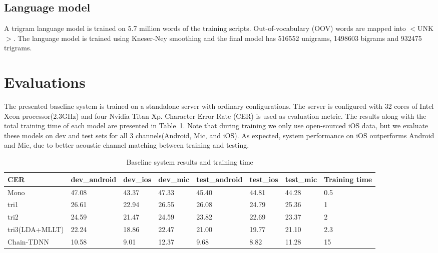 \documentclass[a4paper]{article}
\begin{document}
\subsection{Language model}

A trigram language model is trained on 5.7 million words of the training
scripts. Out-of-vocabulary (OOV) words are mapped into $<$UNK$>$. The language
model is trained using Kneser-Ney smoothing and the final model has 516552
unigrams, 1498603 bigrams and 932475 trigrams.

\section{Evaluations}

The presented baseline system is trained on a standalone server with ordinary
configurations. The server is configured with 32 cores of Intel Xeon processor(2.3GHz) and four
Nvidia Titan Xp. Character Error Rate (CER) is used as evaluation metric. 
The results along with the total training time of each model are presented in Table~\ref{tab:base}. 
Note that during training we only use open-sourced iOS data, but we evaluate
these models on dev and test sets for all 3 channels(Android, Mic, and iOS). As
expected, system performance on iOS outperforms Android and Mic, due to better
acoustic channel matching between training and testing.

\begin{table}[th]
  \caption{Baseline system results and training time}
  \label{tab:base}
  \centering
  \begin{tabular}{ llllllll }
    \toprule
    CER               &  dev\_android           &  dev\_ios           &  dev\_mic           & test\_android            &  test\_ios           &  test\_mic          &  Training time         \\
    \midrule
    Mono        &  47.08                 &  43.37             &  47.33             &  45.40                  &  44.81              &  44.28             &  0.5                   \\
    tri1    &  26.61                 &  22.94             &  26.55             &  26.08                  &  24.79              &  25.36             &  1                     \\
    tri2    &  24.59                 &  21.47             &  24.59             &  23.82                 &  22.69              &  23.37             &  2                     \\
    tri3(LDA+MLLT)          &  22.24                 &  18.86             &  22.47             &  21.00                  &  19.77              &  21.10             &  2.3                   \\
    Chain-TDNN              &  10.58                 &  9.01             &  12.37         &  9.68                  &  8.82             &  11.28              &  15                    \\
    \bottomrule
  \end{tabular}
\end{table}
\end{document}

